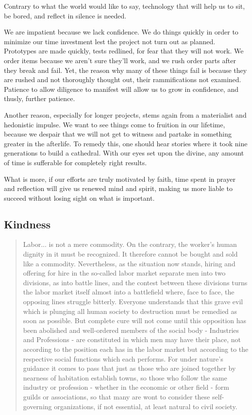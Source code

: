 \documentclass[letterpaper]{article}
\begin{document}
Contrary to what the world would like to say, technology that will help us to sit, be bored, and reflect in silence is needed.

We are impatient because we lack confidence. We do things quickly in order to minimize our time investment lest the project not turn out as planned. Prototypes are made quickly, tests redlined, for fear that they will not work. We order items because we aren't sure they'll work, and we rush order parts after they break and fail. Yet, the reason why many of these things fail is because they are rushed and not thoroughly thought out, their rammifications not examined. Patience to allow diligence to manifest will allow us to grow in confidence, and thusly, further patience.

Another reason, especially for longer projects, stems again from a materialist and hedonistic impulse. We want to see things come to fruition in our lifetime, because we despair that we will not get to witness and partake in something greater in the afterlife. To remedy this, one should hear stories where it took nine generations to build a cathedral. With our eyes set upon the divine, any amount of time is sufferable for completely right results.

What is more, if our efforts are truly motivated by faith, time spent in prayer and reflection will give us renewed mind and spirit, making us more liable to succeed without losing sight on what is important.


\subsection{Kindness}

\begin{quote}
  Labor... is not a mere commodity. On the contrary, the worker's human dignity in it must be recognized. It therefore cannot be bought and sold like a commodity. Nevertheless, as the situation now stands, hiring and offering for hire in the so-called labor market separate men into two divisions, as into battle lines, and the contest between these divisions turns the labor market itself almost into a battlefield where, face to face, the opposing lines struggle bitterly. Everyone understands that this grave evil which is plunging all human society to destruction must be remedied as soon as possible. But complete cure will not come until this opposition has been abolished and well-ordered members of the social body - Industries and Professions - are constituted in which men may have their place, not according to the position each has in the labor market but according to the respective social functions which each performs. For under nature's guidance it comes to pass that just as those who are joined together by nearness of habitation establish towns, so those who follow the same industry or profession - whether in the economic or other field - form guilds or associations, so that many are wont to consider these self-governing organizations, if not essential, at least natural to civil society.
\end{quote}
\end{document}
